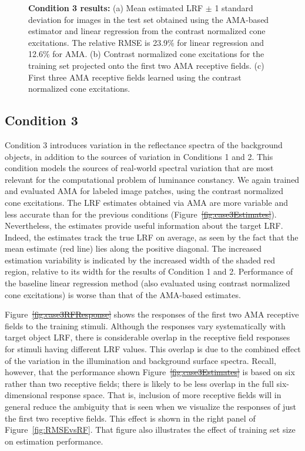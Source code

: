 \documentclass{jov}
\providecommand{\DIFaddtex}[1]{{\protect\color{blue}\uwave{#1}}} %
\providecommand{\DIFdeltex}[1]{{\protect\color{red}\sout{#1}}}                      %
\providecommand{\DIFaddbegin}{} %
\providecommand{\DIFaddend}{} %
\providecommand{\DIFdelbegin}{} %
\providecommand{\DIFdelend}{} %
\providecommand{\DIFaddendFL}{} %
\providecommand{\DIFadd}[1]{\texorpdfstring{\DIFaddtex{#1}}{#1}} %
\providecommand{\DIFdel}[1]{\texorpdfstring{\DIFdeltex{#1}}{}} %
\newcommand{\DIFscaledelfig}{0.5}
\newlength{\DIFdelgraphicswidth} %
\newlength{\DIFdelgraphicsheight} %
\newcommand{\DIFaddincludegraphics}[2][]{{\color{blue}\fbox{\DIFOincludegraphics[#1]{#2}}}} %
\newcommand{\DIFdelincludegraphics}[2][]{%
\sbox{\DIFdelgraphicsbox}{\DIFOincludegraphics[#1]{#2}}%
\settoboxwidth{\DIFdelgraphicswidth}{\DIFdelgraphicsbox} %
\settoboxtotalheight{\DIFdelgraphicsheight}{\DIFdelgraphicsbox} %
\scalebox{\DIFscaledelfig}{%
\parbox[b]{\DIFdelgraphicswidth}{\usebox{\DIFdelgraphicsbox}\\[-\baselineskip] \rule{\DIFdelgraphicswidth}{0em}}\llap{\resizebox{\DIFdelgraphicswidth}{\DIFdelgraphicsheight}{%
\setlength{\unitlength}{\DIFdelgraphicswidth}%
\begin{picture}(1,1)%
\thicklines\linethickness{2pt} %
{\color[rgb]{1,0,0}\put(0,0){\framebox(1,1){}}}%
{\color[rgb]{1,0,0}\put(0,0){\line( 1,1){1}}}%
{\color[rgb]{1,0,0}\put(0,1){\line(1,-1){1}}}%
\end{picture}%
}\hspace*{3pt}}} %
} %
\DeclareRobustCommand{\DIFaddbegin}{\DIFOaddbegin \let\includegraphics\DIFaddincludegraphics} %
\DeclareRobustCommand{\DIFaddend}{\DIFOaddend \let\includegraphics\DIFOincludegraphics} %
\DeclareRobustCommand{\DIFdelbegin}{\DIFOdelbegin \let\includegraphics\DIFdelincludegraphics} %
\DeclareRobustCommand{\DIFdelend}{\DIFOaddend \let\includegraphics\DIFOincludegraphics} %
\DeclareRobustCommand{\DIFaddendFL}{\DIFOaddendFL \let\includegraphics\DIFOincludegraphics} %
\begin{document}
\begin{figure}
    \DIFaddendFL \caption{{\bf Condition 3 results:} (a) Mean estimated LRF $\pm$ 1 standard deviation for images in the test set obtained using the AMA-based estimator and linear regression from the contrast normalized cone excitations. The relative RMSE is 23.9\%  for linear regression and 12.6\% for AMA. (b) Contrast normalized cone excitations for the training set projected onto the first two AMA receptive fields. (c) First three AMA receptive fields learned using the contrast normalized cone excitations.}
\label{fig:Condition3}
\end{figure}

\subsection{Condition 3}

Condition 3 introduces variation in the reflectance spectra of the background objects, in addition to the sources of variation in Conditions 1 and 2.
This condition models the sources of real-world spectral variation that are most relevant for the computational problem of luminance constancy.
We again trained and evaluated AMA for labeled image patches, using the contrast normalized cone excitations.
The LRF estimates obtained via AMA are more variable and less accurate than for the previous conditions (Figure~\DIFdelbegin \DIFdel{\ref{fig:case3Estimates}}\DIFdelend \DIFaddbegin \DIFadd{\ref{fig:Condition3}a}\DIFaddend ).
Nevertheless, the estimates provide useful information about the target LRF.
Indeed, the estimates track the true LRF on average, as seen by the fact that the mean estimate (red line) lies along the positive diagonal.
The increased estimation variability is indicated by the increased width of the shaded red region, relative to its width for the results of Condition 1 and 2.
Performance of the baseline linear regression method (also evaluated using contrast normalized cone excitations) is worse than that of the AMA-based estimates.

Figure~\DIFdelbegin \DIFdel{\ref{fig:case3RFResponse} }\DIFdelend \DIFaddbegin \DIFadd{\ref{fig:Condition3}b }\DIFaddend shows the responses of the first two AMA receptive fields to the training stimuli.
Although the responses vary systematically with target object LRF, there is considerable overlap in the receptive field responses for stimuli having different LRF values.
This overlap is due to the combined effect of the variation in the illumination and background surface spectra.
Recall, however, that the performance shown Figure~\DIFdelbegin \DIFdel{\ref{fig:case3Estimates} }\DIFdelend \DIFaddbegin \DIFadd{\ref{fig:Condition3}a }\DIFaddend is based on six rather than two receptive fields;
there is likely to be less overlap in the full six-dimensional response space.
That is, inclusion of more receptive fields will in general reduce the ambiguity that is seen when we visualize the responses of just the first two receptive fields.
This effect is shown in the right panel of Figure~\ref{fig:RMSEvsRF}.
That figure also illustrates the effect of training set size on estimation performance. 
\end{document}

